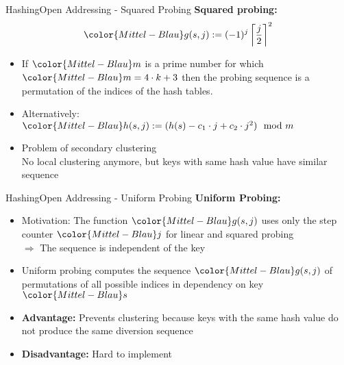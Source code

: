 
\begin{frame}{Hashing}{Open Addressing - Squared Probing}
  \textbf{Squared probing:}
  \begin{displaymath}
    {\color{Mittel-Blau}g(s,j)
    := (-1)^j
    \left\lceil \frac{j}{2} \right\rceil^2}
  \end{displaymath}
  \vspace{-1.0em}
  \begin{itemize}
    \item<2->
      If ${\color{Mittel-Blau}m}$ is a prime number for which
      \begin{math}
        {\color{Mittel-Blau}m = 4 \cdot k + 3}
      \end{math}
      then the probing sequence is a permutation of the indices of
      the hash tables.
   \item<3->
      Alternatively:
      \begin{math}
        {\color{Mittel-Blau}h(s,j) := (h(s) - c_1 \cdot j + c_2 \cdot j^2) \mod m}
      \end{math}
    \item<4->
      Problem of secondary clustering\\
      No local clustering anymore, but keys with same hash value
      have similar sequence
      
  \end{itemize}
\end{frame}


\begin{frame}{Hashing}{Open Addressing - Uniform Probing}
  \textbf{Uniform Probing:}
  \begin{itemize}
    \item<2->
      Motivation: The function ${\color{Mittel-Blau}g(s,j)}$ uses only the step
      counter ${\color{Mittel-Blau}j}$ for linear and squared probing\\
      {\color{red}$\Rightarrow$ The sequence is independent of the key}
    \item<3->
      Uniform probing computes the sequence ${\color{Mittel-Blau}g(s,j)}$ of permutations of all possible indices in dependency on key ${\color{Mittel-Blau}s}$ 
    \item<4->
      \textbf{Advantage:}
      Prevents clustering because keys with the same hash value do not produce
      the same diversion sequence
    \item<5->
      \textbf{Disadvantage:}
      Hard to implement
  \end{itemize}
\end{frame}

